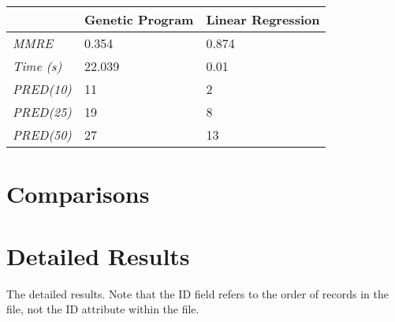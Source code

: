 \documentclass[11pt, a4paper]{article}
\begin{document}
\begin{tabularx}{\textwidth}{| l | X | X |}
\hline
 & \textbf{Genetic Program} & \textbf{Linear Regression} \\
\hline
\emph{MMRE} & 0.354 & 0.874 \\
\emph{Time (s)} & 22.039 & 0.01 \\
\emph{PRED(10)} & 11 & 2 \\
\emph{PRED(25)} & 19 & 8 \\
\emph{PRED(50)} & 27 & 13 \\
\hline
\end{tabularx}

\section{Comparisons} %
\label{sec:comparisons}
\newpage
\appendix
\section{Detailed Results} %
\label{sec:detailed_results}
The detailed results. Note that the ID field refers to the order of records in
the file, not the ID attribute within the file.





 
\end{document}
